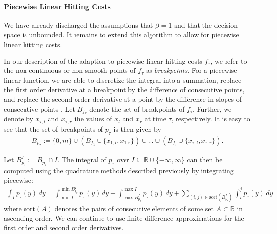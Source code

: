 \paragraph{Piecewise Linear Hitting Costs} We have already discharged the assumptions that $\beta = 1$ and that the decision space is unbounded. It remains to extend this algorithm to allow for piecewise linear hitting costs.

In our description of the adaption to piecewise linear hitting costs $f_{\tau}$, we refer to the non-continuous or non-smooth points of $f_{\tau}$ as \emph{breakpoints}. For a piecewise linear function, we are able to discretize the integral into a summation, replace the first order derivative at a breakpoint by the difference of consecutive points, and replace the second order derivative at a point by the difference in slopes of consecutive points \cite{Bansal2015}. Let $B_{f_{\tau}}$ denote the set of breakpoints of $f_{\tau}$. Further, we denote by $x_{\tau,l}$ and $x_{\tau,r}$ the values of $x_l$ and $x_r$ at time $\tau$, respectively. It is easy to see that the set of breakpoints of $p_{\tau}$ is then given by \begin{align*}
    B_{p_{\tau}} := \{0, m\} \cup \left(B_{f_1} \cup \{x_{1,l}, x_{1,r}\}\right) \cup \dots \cup \left(B_{f_{\tau}} \cup \{x_{\tau,l}, x_{\tau,r}\}\right).
\end{align*}

Let $B_{p_{\tau}}^I := B_{p_{\tau}} \cap I$. The integral of $p_{\tau}$ over $I \subseteq \mathbb{R} \cup \{-\infty, \infty\}$ can then be computed using the quadrature methods described previously by integrating piecewise: \begin{align*}
    \int_I p_{\tau}(y) \,dy = \int_{\min I}^{\min B_{p_{\tau}}^I} p_{\tau}(y) \,dy + \int_{\max B_{p_{\tau}}^I}^{\max I} p_{\tau}(y) \,dy + \sum_{(i, j) \in \text{sort}(B_{p_{\tau}}^I)} \int_i^j p_{\tau}(y) \,dy
\end{align*} where $\text{sort}(A)$ denotes the pairs of consecutive elements of some set $A \subset \mathbb{R}$ in ascending order. We can continue to use finite difference approximations for the first order and second order derivatives.

